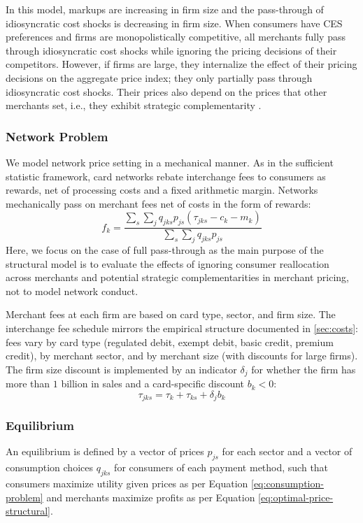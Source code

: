 \documentclass[main.tex]{subfiles}
\begin{document}
In this model, markups are increasing in firm size and the pass-through of idiosyncratic cost shocks is decreasing in firm size. 
When consumers have CES preferences and firms are monopolistically competitive, all merchants fully pass through idiosyncratic cost shocks while ignoring the pricing decisions of their competitors. 
However, if firms are large, they internalize the effect of their pricing decisions on the aggregate price index; they only partially pass through idiosyncratic cost shocks. 
Their prices also depend on the prices that other merchants set, i.e., they exhibit strategic complementarity \citep{Amiti.etal2019}.

\subsubsection{Network Problem}

We model network price setting in a mechanical manner.
As in the sufficient statistic framework, card networks rebate interchange fees to consumers as rewards, net of processing costs and a fixed arithmetic margin.
Networks mechanically pass on merchant fees net of costs in the form of rewards:
\[
f_{k}=\frac{\sum_{s}\sum_{j}q_{jks}p_{js}\left(\tau_{jks}-c_{k} - m_k \right)}{\sum_{s}\sum_{j}q_{jks}p_{js}}
\]
Here, we focus on the case of full pass-through as the main purpose of the structural model is to evaluate the effects of ignoring consumer reallocation across merchants and potential strategic complementarities in merchant pricing, not to model network conduct.

Merchant fees at each firm are based on card type, sector, and firm size. The interchange fee schedule mirrors the empirical structure documented in \ref{sec:costs}: fees vary by card type (regulated debit, exempt debit, basic credit, premium credit), by merchant sector, and by merchant size (with discounts for large firms).
The firm size discount is implemented by an indicator $\delta_{j}$ for whether the firm has more than $1$ billion in sales and a card-specific discount $b_{k}<0$:
\[
\tau_{jks}=\tau_{k}+\tau_{ks}+\delta_{j}b_{k}
\]

\subsubsection{Equilibrium}

An equilibrium is defined by a vector of prices $p_{js}$ for each sector and a vector of consumption choices $q_{jks}$ for consumers of each payment method, such that consumers maximize utility given prices as per Equation \ref{eq:consumption-problem} and merchants maximize profits as per Equation \ref{eq:optimal-price-structural}.
\end{document}
